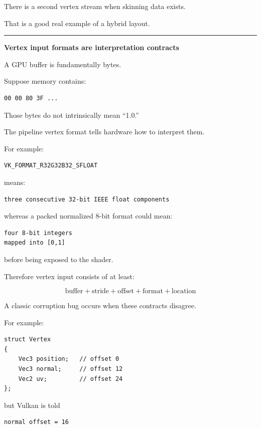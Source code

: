 There is a second vertex stream when skinning data exists.

That is a good real example of a hybrid layout.

\begin{center}\rule{0.5\linewidth}{0.5pt}\end{center}

\textbf{Vertex input formats are interpretation contracts}

A GPU buffer is fundamentally bytes.

Suppose memory contains:

\begin{verbatim}
00 00 80 3F ...
\end{verbatim}

Those bytes do not intrinsically mean ``1.0.''

The pipeline vertex format tells hardware how to interpret them.

For example:

\begin{verbatim}
VK_FORMAT_R32G32B32_SFLOAT
\end{verbatim}

means:

\begin{verbatim}
three consecutive 32-bit IEEE float components
\end{verbatim}

whereas a packed normalized 8-bit format could mean:

\begin{verbatim}
four 8-bit integers
mapped into [0,1]
\end{verbatim}

before being exposed to the shader.

Therefore vertex input consists of at least:

\[
\boxed{\text{buffer}+\text{stride}+\text{offset}+\text{format}+\text{location}}
\]

A classic corruption bug occurs when these contracts disagree.

For example:

\begin{verbatim}
struct Vertex
{
    Vec3 position;   // offset 0
    Vec3 normal;     // offset 12
    Vec2 uv;         // offset 24
};
\end{verbatim}

but Vulkan is told

\begin{verbatim}
normal offset = 16
\end{verbatim}

